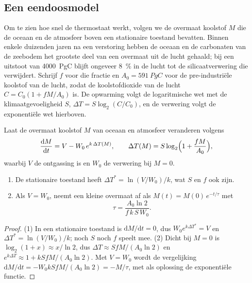 \subsection*{Een eendoosmodel}

Om te zien hoe snel de thermostaat werkt, volgen we de overmaat koolstof $M$ die de oceaan en de atmosfeer
boven een stationaire toestand bevatten. Binnen enkele duizenden jaren na een verstoring hebben de oceaan en de carbonaten van de zeebodem
het grootste deel van een overmaat uit de lucht gehaald; bij een uitstoot van \qty{4000}{PgC} blijft ongeveer
\qty{8}{\percent} in de lucht tot de silicaatverwering die verwijdert. Schrijf $f$ voor die
fractie en $A_0 = \qty{591}{PgC}$ voor de pre-industriële koolstof van de lucht, zodat de koolstofdioxide
van de lucht $C = C_0(1 + fM/A_0)$ is. De opwarming volgt de logaritmische wet met de
klimaatgevoeligheid $S$, $\Delta T = S\log_2(C/C_0)$, en de verwering volgt de exponentiële wet hierboven.

\begin{proposition}\label{prop:b2:deep-time-climate:thermostat}
Laat de overmaat koolstof $M$ van oceaan en atmosfeer veranderen volgens
\[
  \frac{\mathrm dM}{\mathrm dt} = V - W_0\,e^{k\,\Delta T(M)}, \qquad
  \Delta T(M) = S\log_2\Bigl(1 + \frac{fM}{A_0}\Bigr),
\]
waarbij $V$ de ontgassing is en $W_0$ de verwering bij $M = 0$.
\begin{enumerate}
  \item De stationaire toestand heeft $\Delta T^* = \ln(V/W_0)/k$, wat $S$ en $f$ ook zijn.
  \item Als $V = W_0$, neemt een kleine overmaat af als $M(t) = M(0)\,e^{-t/\tau}$ met
        \[
          \tau = \frac{A_0 \ln 2}{f\,k\,S\,W_0} .
        \]
\end{enumerate}
\end{proposition}

\begin{proof}
(1) In een stationaire toestand is $\mathrm dM/\mathrm dt = 0$, dus $W_0e^{k\Delta T^*} = V$ en $\Delta T^* =
\ln(V/W_0)/k$; noch $S$ noch $f$ speelt mee. (2) Dicht bij $M = 0$ is $\log_2(1 + x) \approx x/\ln 2$, dus
$\Delta T \approx SfM/(A_0\ln 2)$ en $e^{k\Delta T} \approx 1 + kSfM/(A_0\ln2)$. Met $V = W_0$
wordt de vergelijking $\mathrm dM/\mathrm dt = -W_0kSfM/(A_0\ln 2) = -M/\tau$, met als oplossing de
exponentiële functie.
\end{proof}

